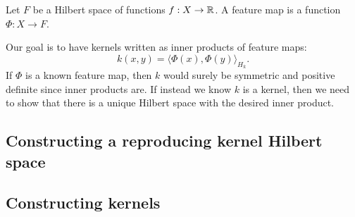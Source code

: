 \begin{definition}
    \cite{rudin2020notes}
    Let \(F\) be a Hilbert space of functions \(f : X \to \mathbb{R}\).
    A feature map is a function \(\Phi : X \to F\).
\end{definition}

Our goal is to have kernels written as inner products of feature maps:
\[k(x,y) = \langle \Phi(x), \Phi(y) \rangle_{H_k}.\]
If \(\Phi\) is a known feature map, then \(k\) would surely be symmetric and positive definite since inner products are.
If instead we know \(k\) is a kernel, then we need to show that there is a unique Hilbert space with the desired inner product.

\subsection{Constructing a reproducing kernel Hilbert space}


\subsection{Constructing kernels}

